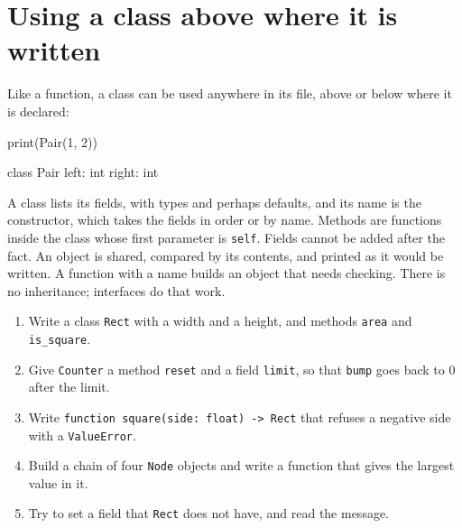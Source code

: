 \section{Using a class above where it is written}

Like a function, a class can be used anywhere in its file, above or
below where it is declared:

\begin{zeno}
print(Pair(1, 2))

class Pair {
    left: int
    right: int
}
\end{zeno}

\begin{summary}
A class lists its fields, with types and perhaps defaults, and its
name is the constructor, which takes the fields in order or by name.
Methods are functions inside the class whose first parameter is
\verb|self|. Fields cannot be added after the fact. An object is
shared, compared by its contents, and printed as it would be written.
A function with a name builds an object that needs checking. There is
no inheritance; interfaces do that work.
\end{summary}

\begin{tryit}
\begin{enumerate}
\item Write a class \verb|Rect| with a width and a height, and methods
  \verb|area| and \verb|is_square|.
\item Give \verb|Counter| a method \verb|reset| and a field
  \verb|limit|, so that \verb|bump| goes back to 0 after the limit.
\item Write \verb|function square(side: float) -> Rect| that refuses a
  negative side with a \verb|ValueError|.
\item Build a chain of four \verb|Node| objects and write a function
  that gives the largest value in it.
\item Try to set a field that \verb|Rect| does not have, and read the
  message.
\end{enumerate}
\end{tryit}
